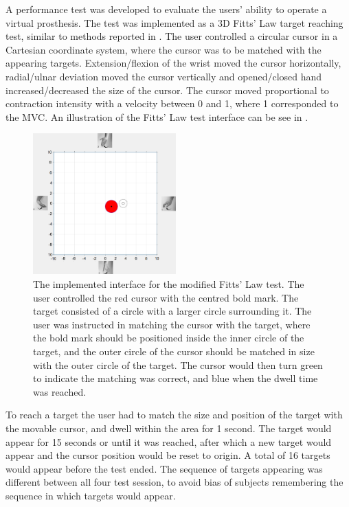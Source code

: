 A performance test was developed to evaluate the users' ability to operate a virtual prosthesis. The test was implemented as a 3D Fitts' Law target reaching test, similar to methods reported in \cite{Scheme2013, Scheme2013a}. The user controlled a circular cursor in a Cartesian coordinate system, where the cursor was to be matched with the appearing targets. Extension/flexion of the wrist moved the cursor horizontally, radial/ulnar deviation moved the cursor vertically and opened/closed hand increased/decreased the size of the cursor. The cursor moved proportional to contraction intensity with a velocity between 0 and 1, where 1 corresponded to the MVC. An illustration of the Fitts' Law test interface can be see in .
\begin{figure}[H] 
	\includegraphics[width=0.49\textwidth]{figures/xBackground/perftestGUI}
	\caption{The implemented interface for the modified Fitts' Law test. The user controlled the red cursor with the centred bold mark. The target consisted of a circle with a larger circle surrounding it. The user was instructed in matching the cursor with the target, where the bold mark should be positioned inside the inner circle of the target, and the outer circle of the cursor should be matched in size with the outer circle of the target. The cursor would then turn green to indicate the matching was correct, and blue when the dwell time was reached.}
	\label{fig:fittsLawTask}
\end{figure}
\vspace{-0.5cm}
To reach a target the user had to match the size and position of the target with the movable cursor, and dwell within the area for 1 second. The target would appear for 15 seconds or until it was reached, after which a new target would appear and the cursor position would be reset to origin. A total of 16 targets would appear before the test ended. The sequence of targets appearing was different between all four test session, to avoid bias of subjects remembering the sequence in which targets would appear.
